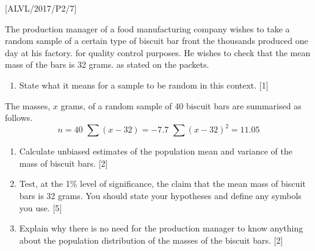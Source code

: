 \item {[}ALVL/2017/P2/7{]}

The production manager of a food manufacturing company wishes to take
a random sample of a certain type of biscuit bar front the thousands
produced one day at his factory. for quality control purposes. He
wishes to check that the mean mass of the bars is 32 grams. as stated
on the packets. 
\begin{enumerate}
\item State what it means for a sample to be random in this context. \hfill{}{[}1{]}
\end{enumerate}
The masses, $x$ grams, of a random sample of 40 biscuit bars are
summarised as follows. 
\[
n=40\,\,\sum\left(x-32\right)=-7.7\,\,\sum\left(x-32\right)^{2}=11.05
\]

\begin{enumerate}
\item Calculate unbiased estimates of the population mean and variance of
the mass of biscuit bars. \hfill{}{[}2{]}
\item Test, at the 1\% level of significance, the claim that the mean mass
of biscuit bars is 32 grams. You should state your hypotheses and
define any symbols you use.\hfill{} {[}5{]}
\item Explain why there is no need for the production manager to know anything
about the population distribution of the masses of the biscuit bars.
\hfill{}{[}2{]}
\end{enumerate}
